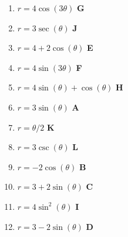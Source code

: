 \documentclass[11pt,answers]{exam}
\begin{document}
\newcommand\aline[1]{\textbf{ #1 }}

\vspace{2ex}
\begin{multicols}{3}
	\begin{enumerate}
		\item $r=4\cos(3\theta)$ \aline{G}
		\item $r = 3\sec(\theta)$ \aline{J}
		\item $r=4+2\cos(\theta)$ \aline{E}
		\item $r=4\sin(3\theta)$ \aline{F}
		\item $r=4\sin(\theta)+\cos(\theta)$ \aline{H}
		\item $r = 3\sin(\theta)$ \aline{A}
		\item $r = \theta/2$ \aline{K}
		\item $r = 3\csc(\theta)$ \aline{L}
		\item $r = -2 \cos(\theta)$ \aline{B}
		\item $r = 3+2\sin(\theta)$ \aline{C}
		\item $r=4\sin^2(\theta)$ \aline{I}
		\item $r = 3-2\sin(\theta)$ \aline{D}
	\end{enumerate}
	\end{multicols}
\clearpage
\end{document}
